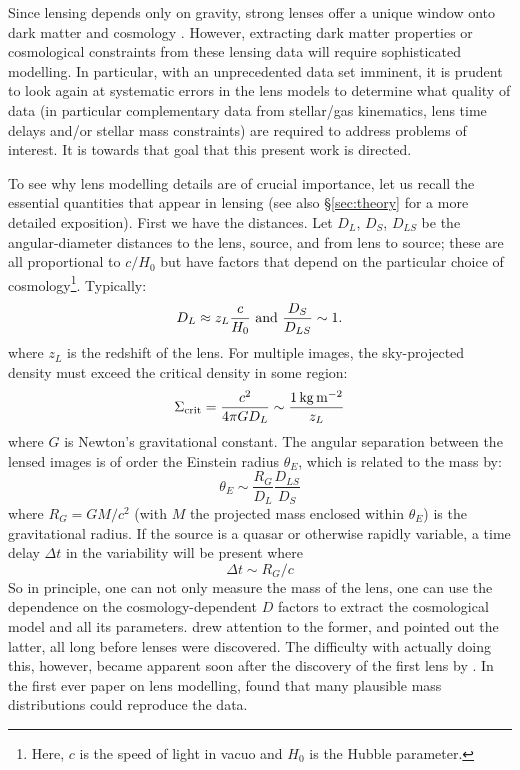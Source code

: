 \documentclass[galley,usenatbib]{mn2e}
\begin{document}
Since lensing depends only on gravity, strong lenses offer a unique window onto
dark matter and cosmology \citep{2010CQGra..27w3001B,2012arXiv1206.1225A}.
However, extracting dark matter properties or cosmological constraints from
these lensing data will require sophisticated modelling. In particular, with an
unprecedented data set imminent, it is prudent to look again at systematic
errors in the lens models to determine what quality of data (in particular
complementary data from stellar/gas kinematics, lens time delays and/or stellar
mass constraints) are required to address problems of interest. It is towards
that goal that this present work is directed.

To see why lens modelling details are of crucial importance, let us
recall the essential quantities that appear in lensing (see also \S\ref{sec:theory} for a more detailed exposition). First we have the distances. Let $D_L$, $D_S$, $D_{LS}$ be the
angular-diameter distances to the lens, source, and from lens to
source; these are all proportional to $c/H_0$ but have factors
that depend on the particular choice of cosmology\footnote{Here, $c$ is the speed of light in vacuo and $H_0$ is the Hubble parameter.}.  Typically:
%
\begin{equation}
D_L \approx z_L \frac c{H_0}\ \hbox{and}\ \frac{D_S}{D_{LS}} \sim 1.
\end{equation}
where $z_L$ is the redshift of the lens. 
%
For multiple images, the sky-projected density must exceed the critical
density in some region:
%
\begin{equation}
\Sigma_\mathrm{crit} = \frac{c^2}{4\pi G D_L} \sim \frac{1\rm\,kg\,m^{-2}}{z_L}
\end{equation}
where $G$ is Newton's gravitational constant. 
%
The angular separation between the lensed images is of order
the Einstein radius $\theta_E$, which is related to
the mass by:
%
\begin{equation}
\theta_E \sim \frac{R_G}{D_L} \frac{D_{LS}}{D_S}
\end{equation}
%
where $R_G = GM/c^2$ (with $M$ the projected mass enclosed within $\theta_E$)
is the gravitational radius. If the source is a quasar or otherwise rapidly
variable, a time delay $\Delta t$ in the variability will be present where
%
\begin{equation}
\Delta t \sim R_G/c
\end{equation}
%
So in principle, one can not only measure the mass of the lens, one can use the
dependence on the cosmology-dependent $D$ factors to extract the cosmological
model and all its parameters.  \cite{1937ApJ....86..217Z} drew attention to the
former, and \cite{1964MNRAS.128..307R,1966MNRAS.132..101R} pointed out the
latter, all long before lenses were discovered.  The difficulty with actually
doing this, however, became apparent soon after the discovery of the first lens
by \cite{1979Natur.279..381W}.  In the first ever paper on lens modelling,
\cite{1981ApJ...244..736Y} found that many plausible mass distributions could
reproduce the data.
\end{document}
